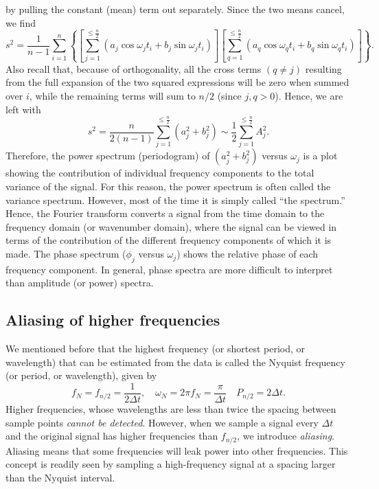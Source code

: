 by pulling the constant (mean) term out separately.  Since the two means cancel, we find
\begin{equation}
s^2 = \frac{1}{n-1}  \sum^n_{i=1} \left \{ \left [ \sum_{j=1} ^{\leq \frac{n}{2}} \left (a_j \cos \omega_{j} t_i + b_j \sin \omega_{j} t_i \right ) \right ] \left [ \sum_{q=1} ^{\leq \frac{n}{2}} \left (a_q \cos \omega_{q} t_i + b_q \sin \omega_{q} t_i \right ) \right ] \right \}.
\end{equation}
Also recall that, because of orthogonality, all the cross terms $(q \neq j)$ resulting from the full expansion 
of the two squared expressions will be zero when summed over $i$, while the remaining terms will sum to $n/2$ (since $j,q > 0$).
Hence, we are left with
\begin{equation}
s^2 = \frac{n}{2(n-1)} \sum_{j=1} ^{\leq \frac{n}{2}} (a^2_j + b^2_j) \sim \frac{1}{2}\sum_{j=1} ^{\leq \frac{n}{2}} A^2_j.
\end{equation}
Therefore, the power spectrum (periodogram) of $(a_j^2 + b_j^2)$ versus $\omega_j$ is a plot showing the 
contribution of individual frequency components to the total variance of the signal.  For this reason, 
the power spectrum is often called the variance spectrum.  However, most of the time it is simply called ``the 
spectrum.''  Hence, the Fourier transform converts a signal from the time domain to the frequency 
domain (or wavenumber domain), where the signal can be viewed in terms of the contribution of 
the different frequency components of which it is made.  The phase spectrum ($\phi_j$ versus $\omega_j$)
shows the relative phase of each frequency component.  In general, phase spectra are more difficult
to interpret than amplitude (or power) spectra.

\subsection{Aliasing of higher frequencies}
	We mentioned before that the highest frequency (or shortest period, or wavelength) that can be 
estimated from the data is called the Nyquist frequency (or period, or wavelength), given by
\begin{equation}
f_N = f_{n/2} = \frac{1}{2\Delta t}, \quad \omega_N = 2\pi f_N = \frac{\pi}{\Delta t}\quad P_{n/2} = 2 \Delta t.
\end{equation}
Higher frequencies, whose wavelengths are less than twice the spacing between sample points 
\emph{cannot be detected}.  However, when we sample a signal every $\Delta t$ and the original signal has 
higher frequencies than $f_{n/2}$, we introduce \emph{aliasing}.  Aliasing means that some frequencies will 
leak power into other frequencies.  This concept is readily seen by sampling a high-frequency 
signal at a spacing larger than the Nyquist interval.

